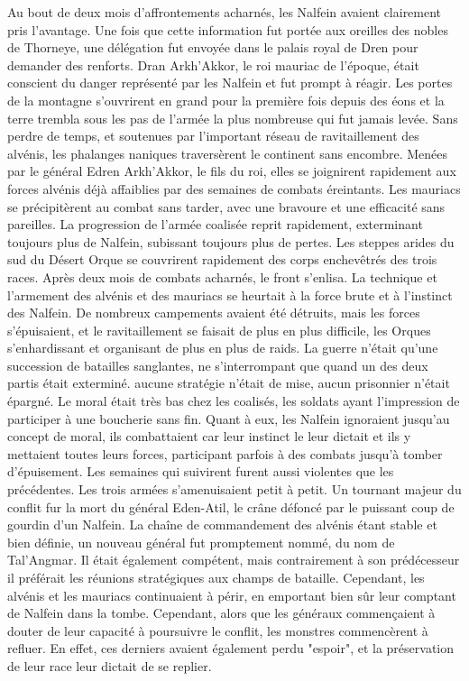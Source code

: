 \newline
Au bout de deux mois d'affrontements acharnés, les Nalfein avaient clairement pris l'avantage. Une fois que cette information fut portée aux oreilles des nobles de Thorneye, une délégation fut envoyée dans le palais royal de Dren pour demander des renforts. Dran Arkh'Akkor, le roi mauriac de l'époque, était conscient du danger représenté par les Nalfein et fut prompt à réagir. Les portes de la montagne s'ouvrirent en grand pour la première fois depuis des éons et la terre trembla sous les pas de l'armée la plus nombreuse qui fut jamais levée. Sans perdre de temps, et soutenues par l'important réseau de ravitaillement des alvénis, les phalanges naniques traversèrent le continent sans encombre. Menées par le général Edren Arkh'Akkor, le fils du roi, elles se joignirent rapidement aux forces alvénis déjà affaiblies par des semaines de combats éreintants. Les mauriacs se précipitèrent au combat sans tarder, avec une bravoure et une efficacité sans pareilles. La progression de l'armée coalisée reprit rapidement, exterminant toujours plus de Nalfein, subissant toujours plus de pertes. Les steppes arides du sud du Désert Orque se couvrirent rapidement des corps enchevêtrés des trois races.
\newline
Après deux mois de combats acharnés, le front s'enlisa. La technique et l'armement des alvénis et des mauriacs se heurtait à la force brute et à l'instinct des Nalfein. De nombreux campements avaient été détruits, mais les forces s'épuisaient, et le ravitaillement se faisait de plus en plus difficile, les Orques s'enhardissant et organisant de plus en plus de raids. La guerre n'était qu'une succession de batailles sanglantes, ne s'interrompant que quand un des deux partis était exterminé. aucune stratégie n'était de mise, aucun prisonnier n'était épargné. Le moral était très bas chez les coalisés, les soldats ayant l'impression de participer à une boucherie sans fin. Quant à eux, les Nalfein ignoraient jusqu'au concept de moral, ils combattaient car leur instinct le leur dictait et ils y mettaient toutes leurs forces, participant parfois à des combats jusqu'à tomber d'épuisement.
\newline
Les semaines qui suivirent furent aussi violentes que les précédentes. Les trois armées s'amenuisaient petit à petit. Un tournant majeur du conflit fur la mort du général Eden-Atil, le crâne défoncé par le puissant coup de gourdin d'un Nalfein. La chaîne de commandement des alvénis étant stable et bien définie, un nouveau général fut promptement nommé, du nom de Tal'Angmar. Il était également compétent, mais contrairement à son prédécesseur il préférait les réunions stratégiques aux champs de bataille. Cependant, les alvénis et les mauriacs continuaient à périr, en emportant bien sûr leur comptant de Nalfein dans la tombe. Cependant, alors que les généraux commençaient à douter de leur capacité à poursuivre le conflit, les monstres commencèrent à refluer. En effet, ces derniers avaient également perdu "espoir", et la préservation de leur race leur dictait de se replier.
